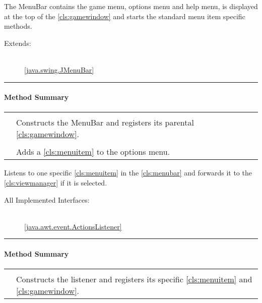 
The MenuBar contains the game menu, options menu and help menu, is displayed at the top of the \ref{cls:gamewindow} and starts the standard menu item specific methods. \\ 
\begin{description}
	\item[Extends:] \hfill \\
		\ref{java.swing.JMenuBar}
\end{description}
\vspace{.5cm}
\hrule
\paragraph*{Method Summary}
\paragraph*{}
\begin{longtable}{Lp{10cm}}
	\startmethodtable
	 \\
	& Constructs the MenuBar and registers its parental \ref{cls:gamewindow}. \\
	 \\
	& Adds a \ref{cls:menuitem} to the options menu. \\ \hline
\end{longtable}



Listens to one specific \ref{cls:menuitem} in the \ref{cls:menubar} and forwards it to the \ref{cls:viewmanager} if it is selected. \\
\begin{description}
	\item[All Implemented Interfaces:] \hfill \\
		\ref{java.awt.event.ActionsListener}
\end{description}
\vspace{.5cm}
\hrule
\paragraph*{Method Summary}
\paragraph*{}
\begin{longtable}{Lp{10cm}}
	\startmethodtable
	 \\
	& Constructs the listener and registers its specific \ref{cls:menuitem} and \ref{cls:gamewindow}. \\ \hline
\end{longtable}


